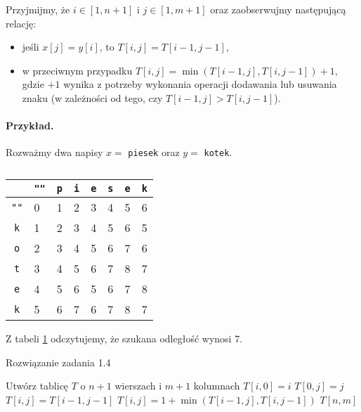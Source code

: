 Przyjmijmy, że $i \in [1, n+1]$ i $ j \in [1, m+1]$ oraz 
zaobserwujmy następującą relację: 
\begin{itemize}
	\item jeśli $x[j]=y[i]$, to $T[i, j] = T[i - 1, j - 1]$,
	\item w przeciwnym przypadku $T[i, j] = \min(T[i - 1, j], T[i, j - 1]) + 1$, gdzie
	$+1$ wynika z potrzeby wykonania operacji dodawania lub usuwania znaku
	(w zależności od tego, czy $T[i - 1, j] > T[i, j - 1]$).
\end{itemize}

\paragraph{Przykład.} Rozważmy dwa napisy $x =$ \texttt{piesek} oraz $y =$ \texttt{kotek}.

\begin{table}[H]
	\center
	\begin{tabular}{|c|lllllll|}
		\hline \diagbox{$y$}{$x$}
		& \multicolumn{1}{l|}{\texttt{""}} & \multicolumn{1}{l|}{\texttt{p}} & \multicolumn{1}{l|}{\texttt{i}} & \multicolumn{1}{l|}{\texttt{e}} & \multicolumn{1}{l|}{\texttt{s}} & \multicolumn{1}{l|}{\texttt{e}} & \multicolumn{1}{l|}{\texttt{k}} \\ \hline
		\texttt{""} & 0 & 1 & 2 & 3 & 4 & 5 & 6 \\ \cline{1-1}
		\texttt{k}  & 1 & 2 & 3 & 4 & 5 & 6 & 5 \\ \cline{1-1}
		\texttt{o}  & 2 & 3 & 4 & 5 & 6 & 7 & 6 \\ \cline{1-1}
		\texttt{t}  & 3 & 4 & 5 & 6 & 7 & 8 & 7 \\ \cline{1-1}
		\texttt{e}  & 4 & 5 & 6 & 5 & 6 & 7 & 8 \\ \cline{1-1}
		\texttt{k}  & 5 & 6 & 7 & 6 & 7 & 8 & 7 \\ \cline{1-1}
		\hline
	\end{tabular}
	\caption{}
	\label{tab_zad14}
\end{table}

Z tabeli \ref{tab_zad14} odczytujemy, że szukana odległość wynosi 7.

\begin{algorithm}[H]
	\caption{Rozwiązanie zadania 1.4}
	\begin{algorithmic}[1]
		\State Utwórz tablicę $T$ o $n + 1$ wierszach i $m + 1$ kolumnach
		\State $T[i, 0] = i$
		\EndFor		
		\State $T[0, j] = j$
		\EndFor
		\State $T[i, j] = T[i - 1, j - 1]$
		\Else
		\State $T[i, j] = 1 + \min(T[i - 1, j], T[i, j - 1])$
		\EndIf
		\EndFor
		\EndFor
		\State \Return $T[n, m]$
		\EndProcedure 
	\end{algorithmic}
	\label{Zadanie14}
\end{algorithm}

